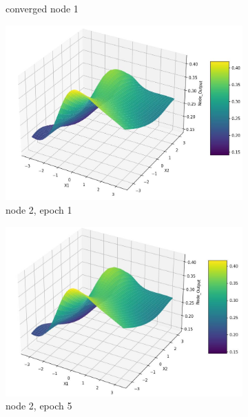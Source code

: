 \documentclass[11pt]{article}
\begin{document}
\begin{figure}[h!]
\begin{subfigure}[b]{0.45\textwidth}
	\caption{converged node 1}
	\label{fig:fig2.1.3.5}
	\end{subfigure}
	\begin{subfigure}[b]{0.30\textwidth}
	\centering
	\includegraphics[scale=0.14]{output_n2_e1.jpg}
	\caption{node 2, epoch 1}
	\label{fig:fig2.1.3.6}
	\end{subfigure}
	\begin{subfigure}[b]{0.30\textwidth}
	\centering
	\includegraphics[scale=0.14]{output_n2_e5.jpg}
	\caption{node 2, epoch 5}
	\label{fig:fig2.1.3.7}
	\end{subfigure}
	\begin{subfigure}[b]{0.30\textwidth}
	\centering

\end{subfigure}
\end{figure}
\end{document}
